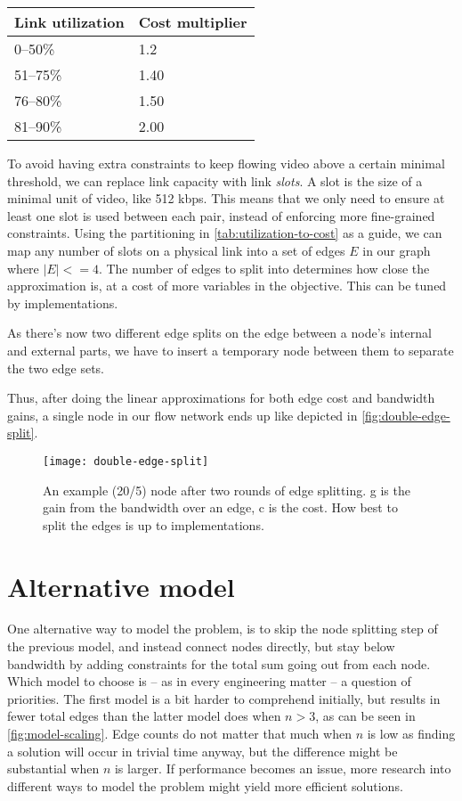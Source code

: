 \begin{center}
    \label{tab:utilization-to-cost}
    \begin{tabular}{| l | l |}
    \hline
    \textbf{Link utilization} & \textbf{Cost multiplier} \\ \hline
    0--50\% & 1.2 \\ \hline
    51--75\% & 1.40 \\ \hline
    76--80\% & 1.50 \\ \hline
    81--90\% & 2.00 \\ \hline
    \end{tabular}
\end{center}

To avoid having extra constraints to keep flowing video above a certain minimal threshold, we can replace link capacity with link \emph{slots}. A slot is the size of a minimal unit of video, like 512 kbps. This means that we only need to ensure at least one slot is used between each pair, instead of enforcing more fine-grained constraints. Using the partitioning in \autoref{tab:utilization-to-cost} as a guide, we can map any number of slots on a physical link into a set of edges $E$ in our graph where $|E| <= 4$. The number of edges to split into determines how close the approximation is, at a cost of more variables in the objective. This can be tuned by implementations.

As there's now two different edge splits on the edge between a node's internal and external parts, we have to insert a temporary node between them to separate the two edge sets.

Thus, after doing the linear approximations for both edge cost and bandwidth gains, a single node in our flow network ends up like depicted in \autoref{fig:double-edge-split}.

\begin{figure}
    \centering
    \texttt{[image: double-edge-split]}
    \caption{An example (20/5) node after two rounds of edge splitting. g is the gain from the bandwidth over an edge, c is the cost. How best to split the edges is up to implementations.}
    \label{fig:double-edge-split}
\end{figure}


\section{Alternative model}\label{sec:alternative-model}

One alternative way to model the problem, is to skip the node splitting step of the previous model, and instead connect nodes directly, but stay below bandwidth by adding constraints for the total sum going out from each node. Which model to choose is -- as in every engineering matter -- a question of priorities. The first model is a bit harder to comprehend initially, but results in fewer total edges than the latter model does when $n>3$, as can be seen in \autoref{fig:model-scaling}. Edge counts do not matter that much when $n$ is low as finding a solution will occur in trivial time anyway, but the difference might be substantial when $n$ is larger. If performance becomes an issue, more research into different ways to model the problem might yield more efficient solutions.

